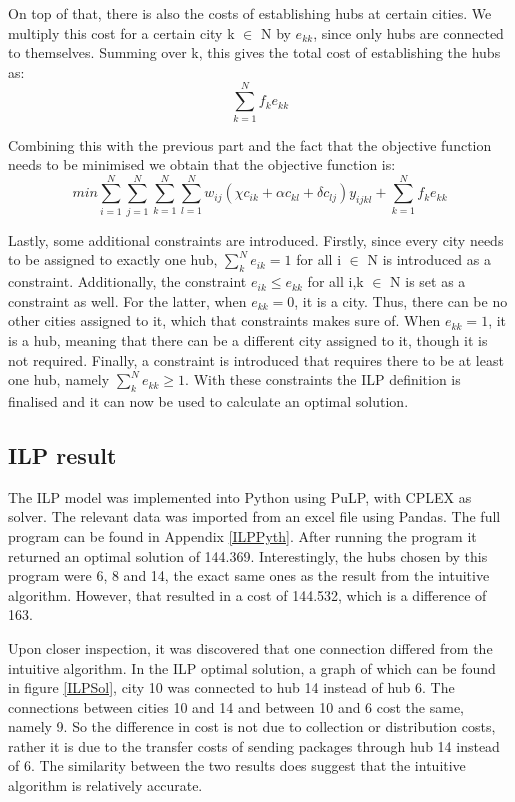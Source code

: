 \documentclass{article}
\begin{document}
On top of that, there is also the costs of establishing hubs at certain cities. We multiply this cost for a certain city k $\in$ N by $e_{kk}$, since only hubs are connected to themselves. Summing over k, this gives the total cost of establishing the hubs as:
$$\sum^N_{k=1} f_k e_{kk}$$

Combining this with the previous part and the fact that the objective function needs to be minimised we obtain that the objective function is:
$$min \sum^N_{i=1}\sum^N_{j=1}\sum^N_{k=1}\sum^N_{l=1} w_{ij}(\chi c_{ik} + \alpha c_{kl} + \delta c_{lj})y_{ijkl} + \sum^N_{k=1} f_k e_{kk}$$

Lastly, some additional constraints are introduced. Firstly, since every city needs to be assigned to exactly one hub, $\sum^N_k e_{ik} = 1$ for all i $\in$ N is introduced as a constraint. Additionally, the constraint $e_{ik} \leq e_{kk}$ for all i,k $\in$ N is set as a constraint as well. For the latter, when $e_{kk} = 0$, it is a city. Thus, there can be no other cities assigned to it, which that constraints makes sure of. When $e_{kk} = 1$, it is a hub, meaning that there can be a different city assigned to it, though it is not required. Finally, a constraint is introduced that requires there to be at least one hub, namely $\sum^N_k e_{kk} \geq 1$. With these constraints the ILP definition is finalised and it can now be used to calculate an optimal solution.

\subsection{ILP result}
The ILP model was implemented into Python using PuLP, with CPLEX as solver. The relevant data was imported from an excel file using Pandas. The full program can be found in Appendix \ref{ILPPyth}. After running the program it returned an optimal solution of 144.369. Interestingly, the hubs chosen by this program were 6, 8 and 14, the exact same ones as the result from the intuitive algorithm. However, that resulted in a cost of 144.532, which is a difference of 163.

Upon closer inspection, it was discovered that one connection differed from the intuitive algorithm. In the ILP optimal solution, a graph of which can be found in figure \ref{ILPSol}, city 10 was connected to hub 14 instead of hub 6. The connections between cities 10 and 14 and between 10 and 6 cost the same, namely 9. So the difference in cost is not due to collection or distribution costs, rather it is due to the transfer costs of sending packages through hub 14 instead of 6. The similarity between the two results does suggest that the intuitive algorithm is relatively accurate.
\end{document}
